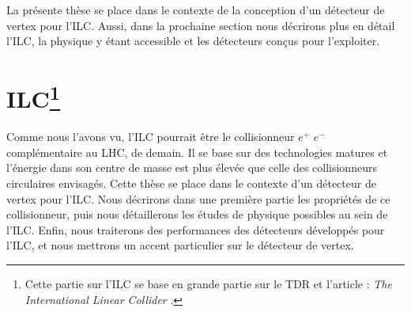   

  
  \medskip
  
  La pr\'esente th\`ese se place dans le contexte de la conception d'un d\'etecteur de vertex pour l'ILC. Aussi, dans la prochaine section nous d\'ecrirons plus en d\'etail l'ILC, la physique y \'etant accessible et les d\'etecteurs conçus pour l'exploiter.
  
  
  \section[ILC]{ILC\protect\footnote{Cette partie sur l'ILC se base en grande partie sur le TDR et l'article : \textit{The International Linear Collider} \cite{BARISH:2013}.}}

  
  Comme nous l'avons vu, l'ILC pourrait être le collisionneur $e^+$ $e^-$ compl\'ementaire au LHC, de demain. Il se base sur des technologies matures et l'\'energie dans son centre de masse est plus \'elev\'ee que celle des collisionneurs circulaires envisag\'es. Cette th\`ese se place dans le contexte d'un d\'etecteur de vertex pour l'ILC. Nous d\'ecrirons dans une premi\`ere partie les propri\'etés de ce collisionneur, puis nous d\'etaillerons les \'etudes de physique possibles au sein de l'ILC. Enfin, nous traiterons des performances des d\'etecteurs d\'eveloppés pour l'ILC, et nous mettrons un accent particulier sur le d\'etecteur de vertex.
  
